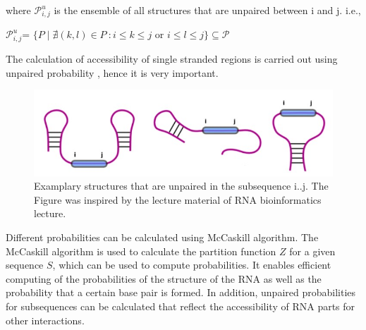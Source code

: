 \documentclass[twoside,a4paper]{report}
\numberwithin{equation}{section}
\begin{document}
  	 where $\mathcal{P}_{i,j}^{u}$ is the ensemble of all structures that are unpaired between i and j.  i.e., \\
  	 
  	 
  	 \begin{center}	 
  	 
  	 	$\mathcal{P}^u_{i,j}$= $\{P \mid \nexists (k,l) \in P\ : i \leq k \leq j $ or $ i \leq l \leq j\}\subseteq \mathcal {P}$
  	 
  	 \end{center}
  	 
  	  The calculation of accessibility of single stranded regions is carried out using  unpaired probability \citep{muckstein2006thermodynamics}, hence it is very important. 
  
 	 
 	 
 	 \begin{figure}[tb]
 	 	\includegraphics[width=0.8\linewidth]{unpaired}
 	 	\centering
 	 	\caption{Examplary structures that are unpaired in the subsequence {i..j}. The Figure was inspired by the lecture material of RNA bioinformatics lecture.\\}
 	 	\label{fig:unpaired}
 	 \end{figure}
  
 	 Different probabilities can be calculated using McCaskill algorithm. The McCaskill algorithm \citep{mccaskill1990equilibrium} is used to calculate the partition function $Z$ for a given sequence $S$, which can be used to compute probabilities. It enables efficient computing of the probabilities of the structure of the RNA as well as the probability that a certain base pair is formed. In addition, unpaired probabilities for subsequences can be calculated that reflect the accessibility of RNA parts for other interactions.\\ 
 	
	
\end{document}
